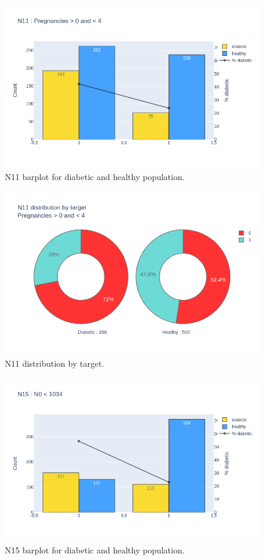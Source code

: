 \documentclass[12pt]{article}
\begin{document}
\begin{figure}[ht]
\centering
\includegraphics[width=1\textwidth]{newplot(37).png}
\caption{\label{fig:45} N11 barplot for diabetic and healthy population.}
\end{figure}

\begin{figure}[ht]
\centering
\includegraphics[width=1\textwidth]{newplot(38).png}
\caption{\label{fig:46} N11 distribution by target.}
\end{figure}

\begin{figure}[ht]
\centering
\includegraphics[width=1\textwidth]{newplot(40).png}
\caption{\label{fig:47} N15 barplot for diabetic and healthy population.}
\end{figure}
\end{document}
